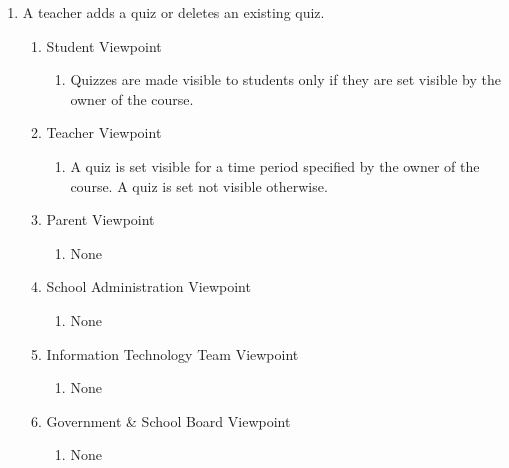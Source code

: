\documentclass[]{article}
\begin{document}
\begin{enumerate}[{BE}1.]
	\item A teacher adds a quiz or deletes an existing quiz.
	\begin{enumerate}[{VP2}.1]
		\item Student Viewpoint
			\begin{enumerate}
				\item Quizzes are made visible to students only if they are set visible by the owner of the course.
			\end{enumerate}
		\item Teacher Viewpoint
			\begin{enumerate}
				\item A quiz is set visible for a time period specified by the owner of the course. A quiz is set not visible otherwise.
			\end{enumerate}
		\item Parent Viewpoint
			\begin{enumerate}
				\item None
			\end{enumerate}
		\item School Administration Viewpoint
			\begin{enumerate}
				\item None
			\end{enumerate}
		\item Information Technology Team Viewpoint
			\begin{enumerate}
				\item None
			\end{enumerate}
		\item Government \& School Board Viewpoint
			\begin{enumerate}
				\item None
			\end{enumerate}
	\end{enumerate}


\end{enumerate}
\end{document}
